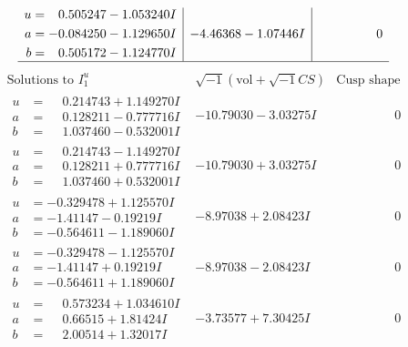 \documentclass[1p]{elsarticle_modified}
\theoremstyle{definition}
\newcommand{\I}{\sqrt{-1}}
\begin{document}
$$\begin{array}{c|c|c}
\begin{aligned}
u &= \phantom{-}0.505247 - 1.053240 I \\
a &= -0.084250 - 1.129650 I \\
b &= \phantom{-}0.505172 - 1.124770 I\end{aligned}
 & -4.46368 - 1.07446 I & \phantom{-0.000000 } 0\\
 \hline 
 \end{array}$$\newpage$$\begin{array}{c|c|c}  
\text{Solutions to }I^u_{1}& \I (\text{vol} + \sqrt{-1}CS) & \text{Cusp shape}\\
 \hline 
\begin{aligned}
u &= \phantom{-}0.214743 + 1.149270 I \\
a &= \phantom{-}0.128211 - 0.777716 I \\
b &= \phantom{-}1.037460 - 0.532001 I\end{aligned}
 & -10.79030 - 3.03275 I & \phantom{-0.000000 } 0 \\ \hline\begin{aligned}
u &= \phantom{-}0.214743 - 1.149270 I \\
a &= \phantom{-}0.128211 + 0.777716 I \\
b &= \phantom{-}1.037460 + 0.532001 I\end{aligned}
 & -10.79030 + 3.03275 I & \phantom{-0.000000 } 0 \\ \hline\begin{aligned}
u &= -0.329478 + 1.125570 I \\
a &= -1.41147 - 0.19219 I \\
b &= -0.564611 - 1.189060 I\end{aligned}
 & -8.97038 + 2.08423 I & \phantom{-0.000000 } 0 \\ \hline\begin{aligned}
u &= -0.329478 - 1.125570 I \\
a &= -1.41147 + 0.19219 I \\
b &= -0.564611 + 1.189060 I\end{aligned}
 & -8.97038 - 2.08423 I & \phantom{-0.000000 } 0 \\ \hline\begin{aligned}
u &= \phantom{-}0.573234 + 1.034610 I \\
a &= \phantom{-}0.66515 + 1.81424 I \\
b &= \phantom{-}2.00514 + 1.32017 I\end{aligned}
 & -3.73577 + 7.30425 I & \phantom{-0.000000 } 0 \\ \hline\begin{aligned}

\end{aligned}
\end{array}$$
\end{document}
